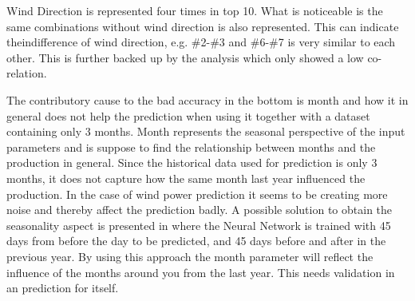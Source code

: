 Wind Direction is represented four times in top 10. What is noticeable is the same combinations without wind direction is also represented. This can indicate theindifference of wind direction, e.g. \#2-\#3 and \#6-\#7 is very similar to each other. This is further backed up by the analysis which only showed a low co-relation.

The contributory cause to the bad accuracy in the bottom is month and how it in general does not help the prediction when using it together with a dataset containing only 3 months. Month represents the seasonal perspective of the input parameters and is suppose to find the relationship between months and the production in general. Since the historical data used for prediction is only 3 months, it does not capture how the same month last year influenced the production. In the case of wind power prediction it seems to be creating more noise and thereby affect the prediction badly. A possible solution to obtain the seasonality aspect is presented in\cite{pjmForecast} where the Neural Network is trained with 45 days from before the day to be predicted, and 45 days before and after in the previous year. By using this approach the month parameter will reflect the influence of the months around you from the last year. This needs validation in an prediction for itself.

